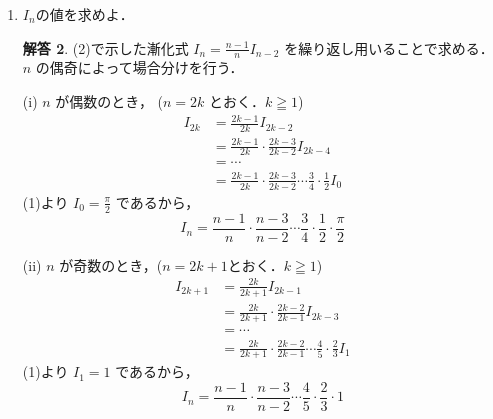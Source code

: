 \documentclass[dvipdfmx]{jlreq}
\theoremstyle{definition}
\newtheorem*{solution}{解答}
\begin{document}
\begin{enumerate}[label=(\arabic*)]
\begin{solution}
    次に，$0 \leqq x \leqq \frac{\pi}{2}$ において $0 \leqq \sin x \leqq 1$ であるから，
    \[\sin^{n+1} x \leqq \sin^n x \leqq \sin^{n-1} x\]
    が成り立つ．辺々を積分して
    \[I_{n+1} \leqq I_n \leqq I_{n-1}\]
    各辺に $I_n > 0$ を掛けると
    \[I_{n+1} I_n \leqq I_n^2 \leqq I_n I_{n-1}\]
    ここで $(\ast)$ より $\displaystyle I_n I_{n-1} = \frac{\pi}{2n}$ である．\\
    また $(\ast)$ において $n$ を $n+1$ とすると $\displaystyle(n+1)I_{n+1}I_n = \frac{\pi}{2}$ より，$\displaystyle I_{n+1}I_n = \frac{\pi}{2(n+1)}$ となる．\\
    これらを不等式に代入して
    \[\frac{\pi}{2(n+1)} \leqq I_n^2 \leqq \frac{\pi}{2n}\]
    各辺に $n$ を掛けると
    \[\frac{n}{n+1} \cdot \frac{\pi}{2} \leqq n I_n^2 \leqq \frac{\pi}{2}\]
    $n \to \infty$ のとき $\displaystyle \frac{n}{n+1} \to 1$ であるから，はさみうちの原理より
    \[\lim_{n \to \infty} n I_n^2 = \frac{\pi}{2}\]
    $I_n > 0$ より $\sqrt{n} I_n > 0$ であるので，平方根をとって
    \[\lim_{n \to \infty} \sqrt{n} I_n = \bm{\sqrt{\frac{\pi}{2}}}\]
    \end{solution}
    \item $I_n$の値を求めよ．
    \begin{solution}
    (2)で示した漸化式 $\displaystyle I_n = \frac{n-1}{n} I_{n-2}$ を繰り返し用いることで求める．
    $n$ の偶奇によって場合分けを行う．

    (i) $n$ が偶数のとき， ($n=2k$ とおく．$k \geqq 1$)
    \begin{align*}
        I_{2k} &= \frac{2k-1}{2k} I_{2k-2} \\
               &= \frac{2k-1}{2k} \cdot \frac{2k-3}{2k-2} I_{2k-4} \\
               &= \cdots \\
               &= \frac{2k-1}{2k} \cdot \frac{2k-3}{2k-2} \cdots \frac{3}{4} \cdot \frac{1}{2} I_0
    \end{align*}
    (1)より $\displaystyle I_0 = \frac{\pi}{2}$ であるから，
    \[ I_n = \frac{n-1}{n} \cdot \frac{n-3}{n-2} \cdots \frac{3}{4} \cdot \frac{1}{2} \cdot \frac{\pi}{2} \]

    (ii) $n$ が奇数のとき，($n=2k+1$とおく．$k \geqq 1$)
    \begin{align*}
        I_{2k+1} &= \frac{2k}{2k+1} I_{2k-1} \\
                 &= \frac{2k}{2k+1} \cdot \frac{2k-2}{2k-1} I_{2k-3} \\
                 &= \cdots \\
                 &= \frac{2k}{2k+1} \cdot \frac{2k-2}{2k-1} \cdots \frac{4}{5} \cdot \frac{2}{3} I_1
    \end{align*}
    (1)より $I_1 = 1$ であるから，
    \[ I_n = \frac{n-1}{n} \cdot \frac{n-3}{n-2} \cdots \frac{4}{5} \cdot \frac{2}{3} \cdot 1 \]


\end{solution}
\end{enumerate}
\end{document}
